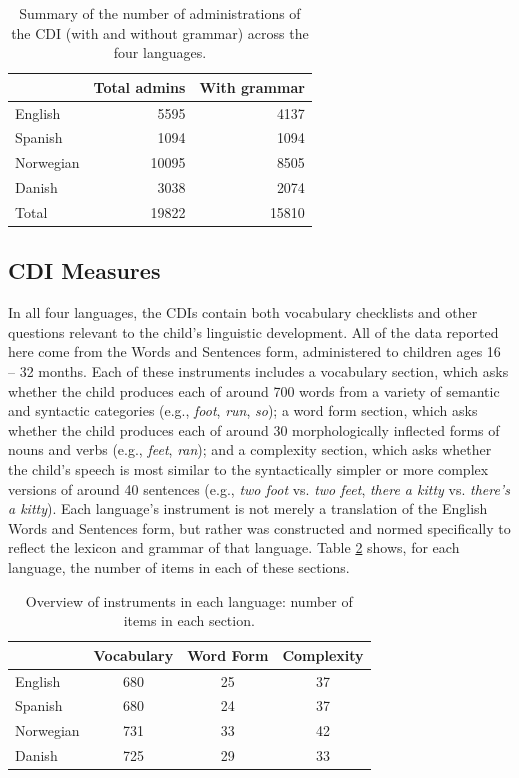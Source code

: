 \documentclass[10pt,letterpaper]{article}
\begin{document}
\begin{table}[t]
\begin{center}
\begin{tabular}{lrr}
\hline
& Total admins & With grammar\\ 
\hline
English & 5595 & 4137\\ 
Spanish & 1094 & 1094\\ 
Norwegian & 10095 & 8505\\ 
Danish & 3038 & 2074\\ 
\hline
Total & 19822 & 15810 \\
\hline
\end{tabular}
\end{center}
\caption{\label{table:num} Summary of the number of administrations of the CDI (with and without grammar) across the four languages.}
\end{table}

\subsection{CDI Measures}

In all four languages, the CDIs contain both vocabulary checklists and other questions relevant to the child's linguistic development. All of the data reported here come from the Words and Sentences form, administered to children ages 16 -- 32 months. Each of these instruments includes a vocabulary section, which asks whether the child produces each of around 700 words from a variety of semantic and syntactic categories (e.g., \emph{foot}, \emph{run}, \emph{so}); a word form section, which asks whether the child produces each of around 30 morphologically inflected forms of nouns and verbs (e.g., \emph{feet}, \emph{ran}); and a complexity section, which asks whether the child's speech is most similar to the syntactically simpler or more complex versions of around 40 sentences (e.g., \emph{two foot} vs. \emph{two feet}, \emph{there a kitty} vs. \emph{there's a kitty}). Each language's instrument is not merely a translation of the English Words and Sentences form, but rather was constructed and normed specifically to reflect the lexicon and grammar of that language. Table \ref{table:measures} shows, for each language, the number of items in each of these sections.

\begin{table}[t]
\begin{center}
\begin{tabular}{lccc}
\hline
& Vocabulary & Word Form & Complexity\\ 
\hline
English & 680 & 25 & 37\\ 
Spanish & 680 & 24 & 37\\ 
Norwegian & 731 & 33 & 42\\ 
Danish & 725 & 29 & 33\\ 
\hline
\end{tabular}
\caption{\label{table:measures} Overview of instruments in each language: number of items in each section.}
\end{center}
\end{table}
\end{document}
